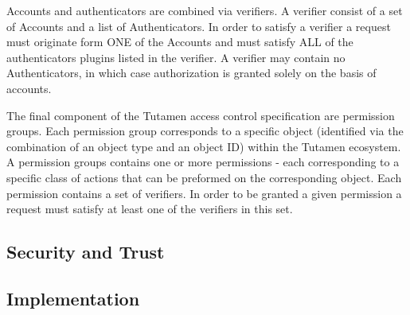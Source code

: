 Accounts and authenticators are combined via verifiers. A verifier
consist of a set of Accounts and a list of Authenticators. In order to
satisfy a verifier a request must originate form ONE of the Accounts
and must satisfy ALL of the authenticators plugins listed in the
verifier. A verifier may contain no Authenticators, in which case
authorization is granted solely on the basis of accounts.

The final component of the Tutamen access control specification are
permission groups. Each permission group corresponds to a specific
object (identified via the combination of an object type and an object
ID) within the Tutamen ecosystem. A permission groups contains one or
more permissions - each corresponding to a specific class of actions
that can be preformed on the corresponding object. Each permission
contains a set of verifiers. In order to be granted a given permission
a request must satisfy at least one of the verifiers in this set.

\subsection{Security and Trust}

\subsection{Implementation}

